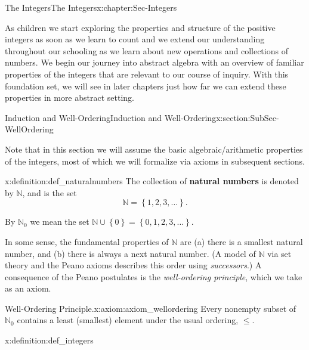 \documentclass[oneside,10pt,]{book}
\newcommand{\terminology}[1]{\textbf{#1}}
\numberwithin{equation}{section}
\renewcommand{\le}{\leqslant}
\newcommand{\set}[1]{\left\{ {#1} \right\}}
\def\N{{\mathbb N}}
\begin{document}
\begin{chapterptx}{The Integers}{}{The Integers}{}{}{x:chapter:Sec-Integers}
\begin{introduction}{}%
As children we start exploring the properties and structure of the positive integers as soon as we learn to count and we extend our understanding throughout our schooling as we learn about new operations and collections of numbers. We begin our journey into abstract algebra with an overview of familiar properties of the integers that are relevant to our course of inquiry. With this foundation set, we will see in later chapters just how far we can extend these properties in more abstract setting.%
\end{introduction}%
%
%
\typeout{************************************************}
\typeout{************************************************}
%
\begin{sectionptx}{Induction and Well-Ordering}{}{Induction and Well-Ordering}{}{}{x:section:SubSec-WellOrdering}
\begin{introduction}{}%
Note that in this section we will assume the basic algebraic\slash{}arithmetic properties of the integers, most of which we will formalize via axioms in subsequent sections.%
\end{introduction}%
\begin{definition}{}{x:definition:def_naturalnumbers}%
 \index{\(\N\)} The collection of \terminology{natural numbers} is denoted by \(\N\), and is the set%
\begin{equation*}
\N = \set{1, 2, 3, \ldots}\text{.}
\end{equation*}
%
\par
By \(\N_0\) we mean the set \(\N\cup \set{0} = \set{0, 1, 2, 3, \ldots}\).%
\end{definition}
In some sense, the fundamental properties of \(\N\) are (a) there is a smallest natural number, and (b) there is always a next natural number. (A model of \(\N\) via set theory and the Peano axioms describes this order using \emph{successors}.) A consequence of the Peano postulates is the \emph{well-ordering principle}, which we take as an axiom.%
\begin{axiom}{Well-Ordering Principle.}{}{x:axiom:axiom_wellordering}%
 Every nonempty subset of \(\N_0\) contains a least (smallest) element under the usual ordering, \(\le\).%
\end{axiom}
\begin{definition}{}{x:definition:def_integers}%

\end{definition}
\end{sectionptx}
\end{chapterptx}
\end{document}
